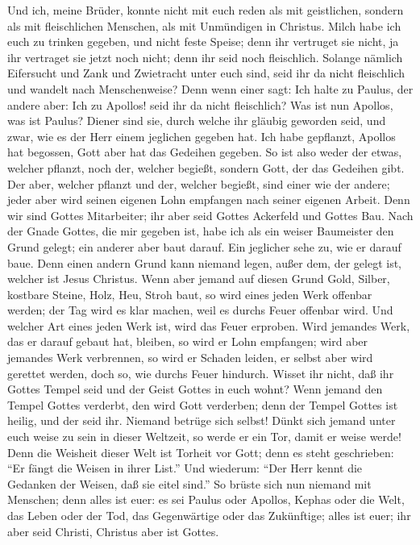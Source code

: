  Und ich, meine Brüder, konnte nicht mit euch reden als
mit geistlichen, sondern als mit fleischlichen Menschen, als mit
Unmündigen in Christus.  Milch habe ich euch zu trinken
gegeben, und nicht feste Speise; denn ihr vertruget sie nicht, ja ihr
vertraget sie jetzt noch nicht;  denn ihr seid noch
fleischlich. Solange nämlich Eifersucht und Zank und Zwietracht unter
euch sind, seid ihr da nicht fleischlich und wandelt nach Menschenweise?
 Denn wenn einer sagt: Ich halte zu Paulus, der andere
aber: Ich zu Apollos! seid ihr da nicht fleischlich?  Was
ist nun Apollos, was ist Paulus? Diener sind sie, durch welche ihr
gläubig geworden seid, und zwar, wie es der Herr einem jeglichen gegeben
hat.  Ich habe gepflanzt, Apollos hat begossen, Gott aber
hat das Gedeihen gegeben.  So ist also weder der etwas,
welcher pflanzt, noch der, welcher begießt, sondern Gott, der das
Gedeihen gibt.  Der aber, welcher pflanzt und der, welcher
begießt, sind einer wie der andere; jeder aber wird seinen eigenen Lohn
empfangen nach seiner eigenen Arbeit.  Denn wir sind
Gottes Mitarbeiter; ihr aber seid Gottes Ackerfeld und Gottes Bau.
 Nach der Gnade Gottes, die mir gegeben ist, habe ich als
ein weiser Baumeister den Grund gelegt; ein anderer aber baut darauf.
Ein jeglicher sehe zu, wie er darauf baue.  Denn einen
andern Grund kann niemand legen, außer dem, der gelegt ist, welcher ist
Jesus Christus.  Wenn aber jemand auf diesen Grund Gold,
Silber, kostbare Steine, Holz, Heu, Stroh baut,  so wird
eines jeden Werk offenbar werden; der Tag wird es klar machen, weil es
durchs Feuer offenbar wird. Und welcher Art eines jeden Werk ist, wird
das Feuer erproben.  Wird jemandes Werk, das er darauf
gebaut hat, bleiben, so wird er Lohn empfangen;  wird
aber jemandes Werk verbrennen, so wird er Schaden leiden, er selbst aber
wird gerettet werden, doch so, wie durchs Feuer hindurch.
 Wisset ihr nicht, daß ihr Gottes Tempel seid und der
Geist Gottes in euch wohnt?  Wenn jemand den Tempel
Gottes verderbt, den wird Gott verderben; denn der Tempel Gottes ist
heilig, und der seid ihr.  Niemand betrüge sich selbst!
Dünkt sich jemand unter euch weise zu sein in dieser Weltzeit, so werde
er ein Tor, damit er weise werde!  Denn die Weisheit
dieser Welt ist Torheit vor Gott; denn es steht geschrieben: ``Er fängt
die Weisen in ihrer List.''  Und wiederum: ``Der Herr
kennt die Gedanken der Weisen, daß sie eitel sind.''  So
brüste sich nun niemand mit Menschen; denn alles ist euer:
 es sei Paulus oder Apollos, Kephas oder die Welt, das
Leben oder der Tod, das Gegenwärtige oder das Zukünftige; alles ist
euer;  ihr aber seid Christi, Christus aber ist Gottes.

